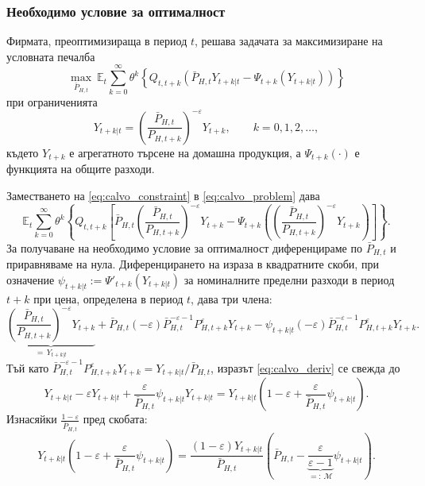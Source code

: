 \subsubsection*{Необходимо условие за оптималност}

Фирмата, преоптимизираща в период $t$, решава задачата за максимизиране на условната печалба
\begin{equation}
\max_{\bar{P}_{H,t}} \ \mathbb{E}_t \sum_{k=0}^{\infty} \theta^k
\left\{ Q_{t,t+k} \left( \bar{P}_{H,t} Y_{t+k|t} - \Psi_{t+k}(Y_{t+k|t}) \right) \right\}
\label{eq:calvo_problem}
\end{equation}
при ограниченията
\begin{equation}
Y_{t+k|t} = \left( \frac{\bar{P}_{H,t}}{P_{H,t+k}} \right)^{-\varepsilon} Y_{t+k},
\qquad k = 0, 1, 2, \dots,
\label{eq:calvo_constraint}
\end{equation}
където $Y_{t+k}$ е агрегатното търсене на домашна продукция, а $\Psi_{t+k}(\cdot)$ е функцията на общите разходи.

Заместването на \eqref{eq:calvo_constraint} в \eqref{eq:calvo_problem} дава
\[
\mathbb{E}_t \sum_{k=0}^{\infty} \theta^k \left\{ Q_{t,t+k}
\left[ \bar{P}_{H,t} \left( \frac{\bar{P}_{H,t}}{P_{H,t+k}} \right)^{-\varepsilon} Y_{t+k}
- \Psi_{t+k}\!\left( \left( \frac{\bar{P}_{H,t}}{P_{H,t+k}} \right)^{-\varepsilon} Y_{t+k} \right) \right] \right\}.
\]
За получаване на необходимо условие за оптималност диференцираме по $\bar{P}_{H,t}$ и приравняваме на нула. Диференцирането на израза в квадратните скоби, при означение $\psi_{t+k|t} := \Psi'_{t+k}(Y_{t+k|t})$ за номиналните пределни разходи в период $t+k$ при цена, определена в период $t$, дава три члена:
\begin{equation}
\underbrace{\left( \frac{\bar{P}_{H,t}}{P_{H,t+k}} \right)^{-\varepsilon} Y_{t+k}}_{= \, Y_{t+k|t}}
+ \bar{P}_{H,t}(-\varepsilon) \bar{P}_{H,t}^{-\varepsilon-1} P_{H,t+k}^{\varepsilon} Y_{t+k}
- \psi_{t+k|t}(-\varepsilon) \bar{P}_{H,t}^{-\varepsilon-1} P_{H,t+k}^{\varepsilon} Y_{t+k}.
\label{eq:calvo_deriv}
\end{equation}
Тъй като $\bar{P}_{H,t}^{-\varepsilon-1} P_{H,t+k}^{\varepsilon} Y_{t+k} = Y_{t+k|t} / \bar{P}_{H,t}$, изразът \eqref{eq:calvo_deriv} се свежда до
\begin{equation}
Y_{t+k|t} - \varepsilon Y_{t+k|t} + \frac{\varepsilon}{\bar{P}_{H,t}} \psi_{t+k|t} Y_{t+k|t}
= Y_{t+k|t} \left( 1 - \varepsilon + \frac{\varepsilon}{\bar{P}_{H,t}} \psi_{t+k|t} \right).
\label{eq:calvo_collect}
\end{equation}
Изнасяйки $\frac{1-\varepsilon}{\bar{P}_{H,t}}$ пред скобата:
\begin{equation}
Y_{t+k|t} \left( 1 - \varepsilon + \frac{\varepsilon}{\bar{P}_{H,t}} \psi_{t+k|t} \right)
= \frac{(1-\varepsilon) Y_{t+k|t}}{\bar{P}_{H,t}}
\left( \bar{P}_{H,t} - \underbrace{\frac{\varepsilon}{\varepsilon-1}}_{=: \, \mathcal{M}} \psi_{t+k|t} \right).
\label{eq:calvo_factored}
\end{equation}


